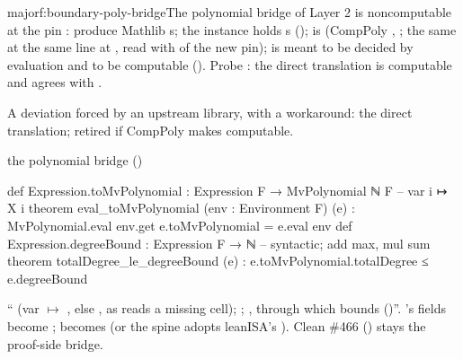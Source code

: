 \begin{finding}{major}{f:boundary-poly-bridge}{The polynomial bridge of Layer 2 is noncomputable at the pin}
 :  produce Mathlib
s; the instance holds s ();
 is  (CompPoly ,
; the same  at the same line at
, read with  of the new pin);  is meant to be decided
by evaluation and  to be computable (). Probe
: the direct translation is computable and agrees with .

 A deviation forced by an upstream library, with a workaround: the direct
translation; retired if CompPoly makes  computable.

\begin{change}{the polynomial bridge ()}
\asis
\begin{leancode}
def Expression.toMvPolynomial : Expression F → MvPolynomial ℕ F     -- var i ↦ X i
theorem eval_toMvPolynomial (env : Environment F) (e) :
    MvPolynomial.eval env.get e.toMvPolynomial = e.eval env
def Expression.degreeBound : Expression F → ℕ                      -- syntactic; add max, mul sum
theorem totalDegree_le_degreeBound (e) : e.toMvPolynomial.totalDegree ≤ e.degreeBound

\end{leancode}
\asproposed \enquote{
(var  $↦$ , else , as  reads a missing
cell);
;
,
through which  bounds  ()}.
's fields become ;  becomes  (or the
spine adopts leanISA's ). Clean \#466 () stays the
proof-side bridge.
\end{change}
\end{finding}

